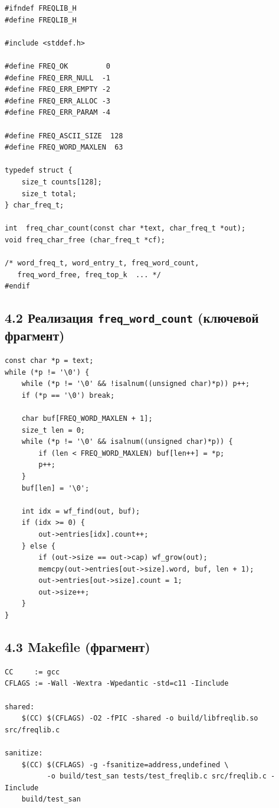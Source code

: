 \begin{lstlisting}[style=Cstyle]
#ifndef FREQLIB_H
#define FREQLIB_H

#include <stddef.h>

#define FREQ_OK         0
#define FREQ_ERR_NULL  -1
#define FREQ_ERR_EMPTY -2
#define FREQ_ERR_ALLOC -3
#define FREQ_ERR_PARAM -4

#define FREQ_ASCII_SIZE  128
#define FREQ_WORD_MAXLEN  63

typedef struct {
    size_t counts[128];
    size_t total;
} char_freq_t;

int  freq_char_count(const char *text, char_freq_t *out);
void freq_char_free (char_freq_t *cf);

/* word_freq_t, word_entry_t, freq_word_count,
   freq_word_free, freq_top_k  ... */
#endif
\end{lstlisting}

\subsection*{4.2 Реализация \texttt{freq\_word\_count} (ключевой фрагмент)}

\begin{lstlisting}[style=Cstyle]
const char *p = text;
while (*p != '\0') {
    while (*p != '\0' && !isalnum((unsigned char)*p)) p++;
    if (*p == '\0') break;

    char buf[FREQ_WORD_MAXLEN + 1];
    size_t len = 0;
    while (*p != '\0' && isalnum((unsigned char)*p)) {
        if (len < FREQ_WORD_MAXLEN) buf[len++] = *p;
        p++;
    }
    buf[len] = '\0';

    int idx = wf_find(out, buf);
    if (idx >= 0) {
        out->entries[idx].count++;
    } else {
        if (out->size == out->cap) wf_grow(out);
        memcpy(out->entries[out->size].word, buf, len + 1);
        out->entries[out->size].count = 1;
        out->size++;
    }
}
\end{lstlisting}

\subsection*{4.3 Makefile (фрагмент)}

\begin{lstlisting}[style=Bashstyle]
CC     := gcc
CFLAGS := -Wall -Wextra -Wpedantic -std=c11 -Iinclude

shared:
    $(CC) $(CFLAGS) -O2 -fPIC -shared -o build/libfreqlib.so src/freqlib.c

sanitize:
    $(CC) $(CFLAGS) -g -fsanitize=address,undefined \
          -o build/test_san tests/test_freqlib.c src/freqlib.c -Iinclude
    build/test_san
\end{lstlisting}

